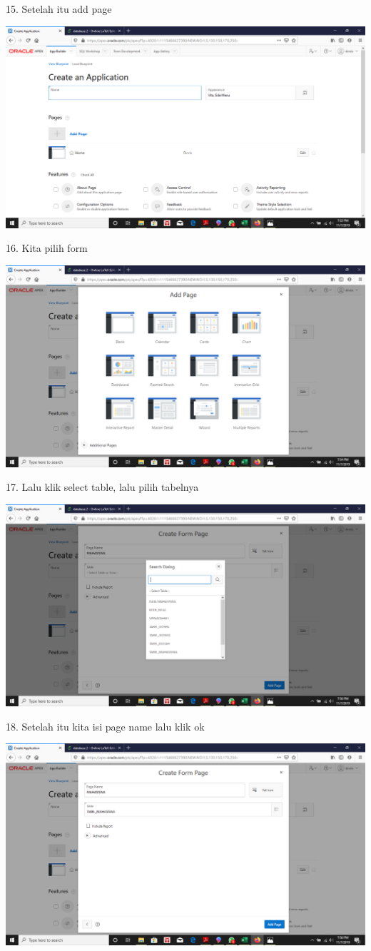 \documentclass{article}
\begin{document}
\item 15. Setelah itu add page
\begin{center}
 \includegraphics[width=10cm\textwidth]{gambar/16.png}
\end{center}
\item 16. Kita pilih form
\begin{center}
 \includegraphics[width=10cm\textwidth]{gambar/17.png}
\end{center}
\item 17. Lalu klik select table, lalu pilih tabelnya
\begin{center}
 \includegraphics[width=10cm\textwidth]{gambar/18.png}
\end{center}
\item 18. Setelah itu kita isi page name lalu klik ok
\begin{center}
 \includegraphics[width=10cm\textwidth]{gambar/19.png}
\end{center}
\end{document}
